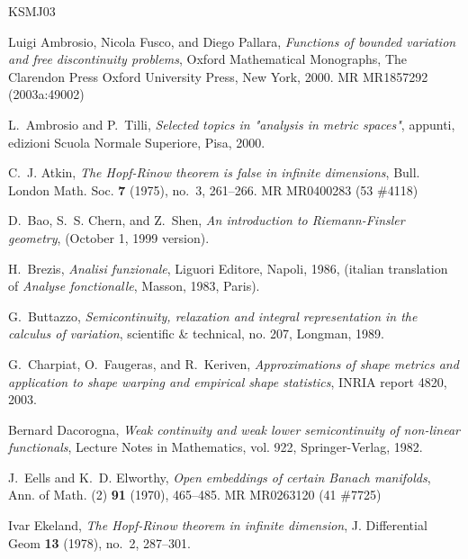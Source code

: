\documentclass[twoside,a4paper,english]{article}
\begin{document}
\providecommand{\bysame}{\leavevmode\hbox to3em{\hrulefill}\thinspace}
\providecommand{\MR}{\relax\ifhmode\unskip\space\fi MR }
\providecommand{\MRhref}[2]{%
  \href{http://www.ams.org/mathscinet-getitem?mr=#1}{#2}
}
\providecommand{\href}[2]{#2}
\begin{thebibliography}{KSMJ03}

Luigi Ambrosio, Nicola Fusco, and Diego Pallara, \emph{Functions of bounded
  variation and free discontinuity problems}, Oxford Mathematical Monographs,
  The Clarendon Press Oxford University Press, New York, 2000. \MR{MR1857292
  (2003a:49002)}

L.~Ambrosio and P.~Tilli, \emph{Selected topics in "analysis in metric
  spaces"}, appunti, edizioni Scuola Normale Superiore, Pisa, 2000.

C.~J. Atkin, \emph{The {H}opf-{R}inow theorem is false in infinite dimensions},
  Bull. London Math. Soc. \textbf{7} (1975), no.~3, 261--266. \MR{MR0400283 (53
  \#4118)}

D.~Bao, S.~S. Chern, and Z.~Shen, \emph{An introduction to {R}iemann-{F}insler
  geometry}, (October 1, 1999 version).

H.~Brezis, \emph{Analisi funzionale}, Liguori Editore, Napoli, 1986, (italian
  translation of \emph{Analyse fonctionalle}, Masson, 1983, Paris).

G.~Buttazzo, \emph{Semicontinuity, relaxation and integral representation in
  the calculus of variation}, scientific \& technical, no. 207, Longman, 1989.

G.~Charpiat, O.~Faugeras, and R.~Keriven, \emph{Approximations of shape metrics
  and application to shape warping and empirical shape statistics}, INRIA
  report 4820, 2003.

Bernard Dacorogna, \emph{Weak continuity and weak lower semicontinuity of
  non-linear functionals}, Lecture Notes in Mathematics, vol. 922,
  Springer-Verlag, 1982.

J.~Eells and K.~D. Elworthy, \emph{Open embeddings of certain {B}anach
  manifolds}, Ann. of Math. (2) \textbf{91} (1970), 465--485. \MR{MR0263120 (41
  \#7725)}

Ivar Ekeland, \emph{The {H}opf-{R}inow theorem in infinite dimension}, J.
  Differential Geom \textbf{13} (1978), no.~2, 287--301.


\end{thebibliography}
\end{document}
